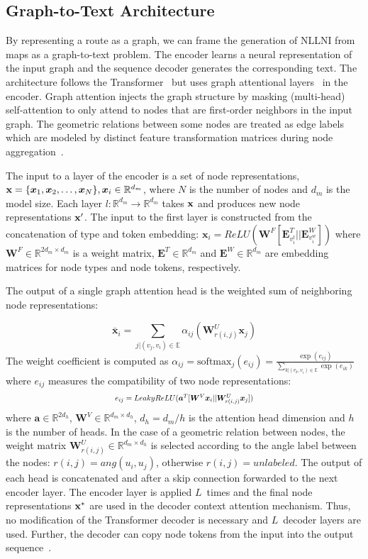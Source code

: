 \documentclass[11pt,a4paper]{article}
\def\va{{\bm{a}}}
\def\vx{{\bm{x}}}
\def\mE{{\bm{E}}}
\def\mW{{\bm{W}}}
\def\sE{{\mathbb{E}}}
\newcommand{\softmax}{\mathrm{softmax}}
\begin{document}
\subsection{Graph-to-Text Architecture}
By representing a route as a graph, we can frame the generation of NLLNI from maps as a graph-to-text problem. The encoder learns a neural representation of the input graph and the sequence decoder generates the corresponding text. The architecture follows the Transformer~\citep{vaswani-etal-2017-attention} but uses graph attentional layers~\citep{velickovic-etal-2018-graph} in the encoder. Graph attention injects the graph structure by masking (multi-head) self-attention to only attend to nodes that are first-order neighbors in the input graph. The geometric relations between some nodes are treated as edge labels which are modeled by distinct feature transformation matrices during node aggregation~\citep{gcnr}.

The input to a layer of the encoder is a set of node representations, ${\bf x} = \{\vx_1, \vx_2, \dots, \vx_N\}, \vx_i \in \mathbb{R}^{d_m}$, where $N$ is the number of nodes and $d_m$ is the model size. Each layer $l: \mathbb{R}^{d_m} \rightarrow \mathbb{R}^{d_m}$ takes ${\bf x}$ and produces new node representations ${\bf x'}$. The input to the first layer is constructed from the concatenation of type and token embedding: $\vx_i=ReLU(\mW^F[\mE^T_{v_i^t} || \mE^W_{v_i^w}])$ where $\mW^F \in \mathbb{R}^{2d_m \times d_m}$  is a weight matrix, $\mE^T \in \mathbb{R}^{d_m}$ and $\mE^W \in \mathbb{R}^{d_m}$ are embedding matrices for node types and node tokens, respectively.

The output of a single graph attention head is the weighted sum of neighboring node representations:

\begin{equation}
	\bar{\vx}_i = \sum_{j | (v_j, v_i) \in \sE}\alpha_{ij}(\mW_{r(i, j)}^U\vx_j)
\end{equation}
The weight coefficient is computed as $\alpha_{ij} = \softmax_j{(e_{ij})} = \frac{ \exp{(e_{ij})} }{ \sum_{k | (v_k, v_i) \in \sE} \exp{(e_{ik})} }$ where $e_{ij}$ measures the compatibility of two node representations:
\vspace{-0.1cm}
\begin{equation}
\resizebox{.42\textwidth}{!}{
$e_{ij} = LeakyReLU(\va^T[\mW^V \vx_i|| \mW_{r(i, j)}^U \vx_j])$
}
\end{equation}
where $\va \in \mathbb{R}^{2d_h}$, $\mW^V \in \mathbb{R}^{d_m \times d_h}$, $d_h = d_m / h$ is the attention head dimension and $h$ is the number of heads. In the case of a geometric relation between nodes, the weight matrix $\mW_{r(i, j)}^U \in \mathbb{R}^{d_m \times d_h}$ is selected according to the angle label between the nodes: $r(i, j) = ang(u_i, u_j)$, otherwise $r(i, j) = unlabeled$. The output of each head is concatenated and after a skip connection forwarded to the next encoder layer. The encoder layer is applied $L$~times and the final node representations ${\bf x^*}$ are used in the decoder context attention mechanism. Thus, no modification of the Transformer decoder is necessary and $L$~decoder layers are used. Further, the decoder can copy node tokens from the input into the output sequence~\citep{copy_point}.
\end{document}
